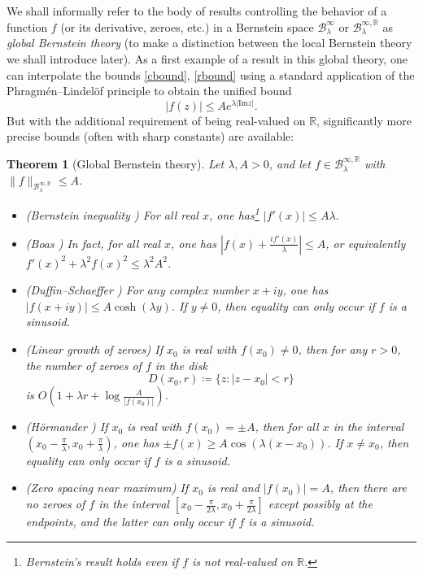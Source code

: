 \documentclass[12pt]{amsart}
\newtheorem{theorem}{Theorem}[section]
\newcommand{\R}{\mathbb{R}}
\renewcommand{\Im}{\mathrm{Im}}
\begin{document}
We shall informally refer to the body of results controlling the behavior of a function $f$ (or its derivative, zeroes, etc.) in a Bernstein space ${\mathcal B}^\infty_\lambda$ or ${\mathcal B}^{\infty,\R}_\lambda$ as \emph{global Bernstein theory} (to make a distinction between the local Bernstein theory we shall introduce later).  As a first example of a result in this global theory, one can interpolate the bounds \eqref{cbound}, \eqref{rbound} using a standard application of the Phragm\'en--Lindel\"of principle to obtain the unified bound
\begin{equation}\label{pl}
        |f(z)| \leq A e^{\lambda |\Im z|}.
\end{equation}
But with the additional requirement of being real-valued on $\R$, significantly more precise bounds (often with sharp constants) are available:

\begin{theorem}[Global Bernstein theory]\label{ds}  Let $\lambda, A > 0$, and let
$f \in {\mathcal B}^{\infty,\R}_\lambda$ with $\|f\|_{{\mathcal B}^{\infty,\R}_\lambda} \leq A$.
\begin{itemize}
    \item[(i)] (Bernstein inequality \cite{bern2}) For all real $x$, one has\footnote{Bernstein's result holds even if $f$ is not real-valued on $\R$.} $|f'(x)| \leq A \lambda$.
    \item[(ii)] (Boas \cite{boas}) In fact, for all real $x$, one has $\left|f(x) + \frac{i f'(x)}{\lambda}\right| \leq A$, or equivalently $f'(x)^2 + \lambda^2 f(x)^2 \leq \lambda^2 A^2$.
    \item[(iii)]  (Duffin--Schaeffer \cite{duffin})  For any complex number $x+iy$, one has $|f(x+iy)| \leq A \cosh(\lambda y)$.  If $y \neq 0$, then equality can only occur if $f$ is a sinusoid.
    \item[(iv)]  (Linear growth of zeroes) If $x_0$ is real with $f(x_0) \neq 0$, then for any $r>0$, the number of zeroes of $f$ in the disk
    $$D(x_0,r) \coloneqq \{ z: |z-x_0| < r \}$$
     is $O(1+\lambda r + \log \frac{A}{|f(x_0)|})$.
    \item[(v)]  (H\"ormander \cite{hormander}) If $x_0$ is real with $f(x_0) = \pm A$, then for all $x$ in the interval $(x_0 - \frac{\pi}{\lambda}, x_0 + \frac{\pi}{\lambda})$, one has $\pm f(x) \geq A \cos(\lambda (x-x_0))$.  If $x \neq x_0$, then equality can only occur if $f$ is a sinusoid.
    \item[(vi)]  (Zero spacing near maximum) If $x_0$ is real and $|f(x_0)|=A$, then there are no zeroes of $f$ in the interval $[x_0 - \frac{\pi}{2\lambda}, x_0 + \frac{\pi}{2\lambda}]$ except possibly at the endpoints, and the latter can only occur if $f$ is a sinusoid.
\end{itemize}
\end{theorem}
\end{document}
